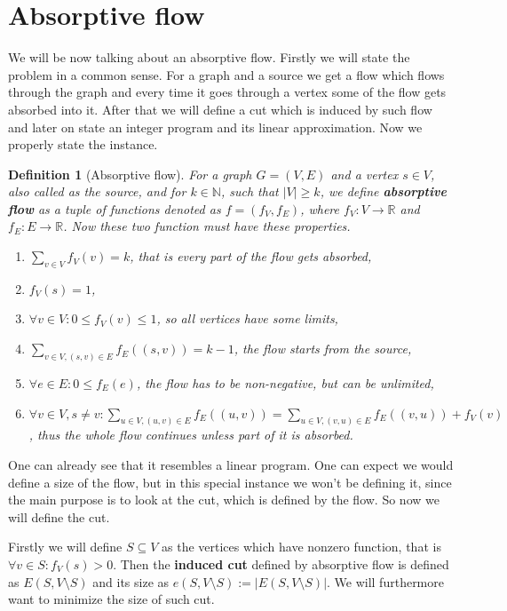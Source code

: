 \documentclass{article}
\theoremstyle{plain}
\theoremstyle{plain}
\newtheorem{defn}{Definition}
\theoremstyle{remark}
\begin{document}
	\section{Absorptive flow}
	
	We will be now talking about an absorptive flow. Firstly we will state the problem in a common sense. For a graph and a source we get a flow which flows through the graph and every time it goes through a vertex some of the flow gets absorbed into it. After that we will define a cut which is induced by such flow and later on state an integer program and its linear approximation. Now we properly state the instance.
	
	\begin{defn}[Absorptive flow]
		For a graph $G = (V,E)$ and a vertex $s \in V$, also called as the \textit{source}, and for $k \in \mathbb{N}$, such that $|V| \geq k$, we define \textbf{absorptive flow} as a tuple of functions denoted as $f = (f_V, f_E)$, where $f_V : V \to \mathbb{R}$ and $f_E : E \to \mathbb{R}$. Now these two function must have these properties.
		
		\begin{enumerate}
			\item $\sum_{v \in V} f_V (v) = k$, that is every part of the flow gets absorbed,
			\item $f_V(s) = 1$,
			\item $\forall v \in V : 0 \leq f_V(v) \leq 1$, so all vertices have some limits,
			\item $\sum_{v \in V, (s,v) \in E} f_E((s,v)) = k-1$, the flow starts from the source,
			\item $\forall e \in E : 0 \leq f_E(e)$, the flow has to be non-negative, but can be unlimited,
			\item $\forall v \in V, s \neq v : \sum_{u \in V, (u,v) \in E} f_E((u,v)) = \sum_{u \in V, (v,u) \in E} f_E((v,u)) + f_V(v)$, thus the whole flow continues unless part of it is absorbed.
		\end{enumerate}
	\end{defn}
	
	One can already see that it resembles a linear program. One can expect we would define a size of the flow, but in this special instance we won't be defining it, since the main purpose is to look at the cut, which is defined by the flow. So now we will define the cut.
	
	Firstly we will define $S \subseteq V$ as the vertices which have nonzero function, that is $\forall v \in S : f_V(s) > 0$. Then the \textbf{induced cut} defined by absorptive flow is defined as $E(S, V \setminus S)$ and its size as $e(S, V \setminus S) := |E(S, V \setminus S)|$. We will furthermore want to minimize the size of such cut.
	
\end{document}
